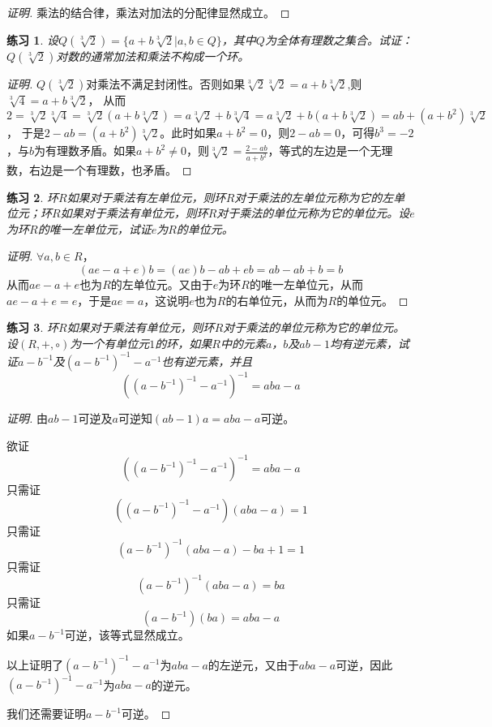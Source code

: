 \documentclass{article}
\newtheorem{Exercise}{练习}
\begin{document}
\begin{CJK*}{UTF8}{gbsn}
\begin{proof}[证明]
  乘法的结合律，乘法对加法的分配律显然成立。
\end{proof}
\begin{Exercise}
  设$Q(\sqrt[3]{2})=\{a+b\sqrt[3]{2}|a,b\in Q\}$，其中$Q$为全体有理数之集合。试证：$Q(\sqrt[3]{2})$对数的通常加法和乘法不构成一个环。
\end{Exercise}
\begin{proof}[证明]
  $Q(\sqrt[3]{2})$对乘法不满足封闭性。否则如果$\sqrt[3]{2}\sqrt[3]{2}=a+b\sqrt[3]{2}$,则$\sqrt[3]{4}=a+b\sqrt[3]{2}$，
  从而$2=\sqrt[3]{2}\sqrt[3]{4}=\sqrt[3]{2}(a+b\sqrt[3]{2})=a\sqrt[3]{2}+b\sqrt[3]{4}=a\sqrt[3]{2}+b(a+b\sqrt[3]{2})=ab+(a+b^2)\sqrt[3]{2}$，
  于是$2-ab=(a+b^2)\sqrt[3]{2}$。此时如果$a+b^2=0$，则$2-ab=0$，可得$b^3=-2$，与$b$为有理数矛盾。如果$a+b^2\neq 0$，则$\sqrt[3]{2}=\frac{2-ab}{a+b^2}$，等式的左边是一个无理数，右边是一个有理数，也矛盾。
\end{proof}
\begin{Exercise}
  环$R$如果对于乘法有左单位元，则环$R$对于乘法的左单位元称为它的左单位元；环$R$如果对于乘法有单位元，则环$R$对于乘法的单位元称为它的单位元。设$e$为环$R$的唯一左单位元，试证$e$为$R$的单位元。
\end{Exercise}
\begin{proof}[证明]
  $\forall a,b\in R$，
  \[(ae-a+e)b=(ae)b-ab+eb=ab-ab+b=b\]
  从而$ae-a+e$也为$R$的左单位元。又由于$e$为环$R$的唯一左单位元，从而$ae-a+e=e$，于是$ae=a$，这说明$e$也为$R$的右单位元，从而为$R$的单位元。
\end{proof}
\begin{Exercise}
  环$R$如果对于乘法有单位元，则环$R$对于乘法的单位元称为它的单位元。设$(R,+,\circ)$为一个有单位元$1$的环，如果$R$中的元素$a$，$b$及$ab-1$均有逆元素，试证$a-b^{-1}$及$(a-b^{-1})^{-1}-a^{-1}$也有逆元素，并且
\[((a-b^{-1})^{-1}-a^{-1})^{-1}=aba-a\]
\end{Exercise}
\begin{proof}[证明]
  由$ab-1$可逆及$a$可逆知$(ab-1)a=aba-a$可逆。

  欲证
  \[((a-b^{-1})^{-1}-a^{-1})^{-1}=aba-a\]
  只需证
  \[((a-b^{-1})^{-1}-a^{-1})(aba-a)=1\]
  只需证
  \[(a-b^{-1})^{-1}(aba-a)-ba+1=1\]
  只需证
  \[(a-b^{-1})^{-1}(aba-a)=ba\]
  只需证
  \[(a-b^{-1})(ba)=aba-a\]
  如果$a-b^{-1}$可逆，该等式显然成立。

  以上证明了$(a-b^{-1})^{-1}-a^{-1}$为$aba-a$的左逆元，又由于$aba-a$可逆，因此$(a-b^{-1})^{-1}-a^{-1}$为$aba-a$的逆元。


  我们还需要证明$a-b^{-1}$可逆。


\end{proof}
\end{CJK*}
\end{document}

